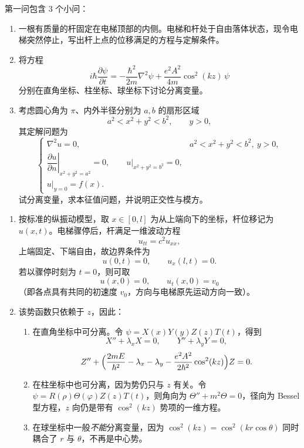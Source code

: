 ﻿

\begin{question}[回答以下问题]

第一问包含 3 个小问：
\begin{enumerate}[label=(\arabic*),leftmargin=2.6em,itemsep=0.25em,topsep=0.2em]
\item 一根有质量的杆固定在电梯顶部的内侧。电梯和杆处于自由落体状态，现令电梯突然停止，写出杆上点的位移满足的方程与定解条件。
\item 将方程
\[
 i\hbar\frac{\partial\psi}{\partial t}
 =-\frac{\hbar^2}{2m}\nabla^2\psi+\frac{e^2A^2}{4m}\cos^2(kz)\,\psi
\]
分别在直角坐标、柱坐标、球坐标下讨论分离变量。
\item 考虑圆心角为 $\pi$、内外半径分别为 $a,b$ 的扇形区域
\[
 a^2<x^2+y^2<b^2,\qquad y>0,
\]
其定解问题为
\[
\begin{cases}
\nabla^2u=0, & a^2<x^2+y^2<b^2,\ y>0,\\
\left.\dfrac{\partial u}{\partial n}\right|_{x^2+y^2=a^2}=0,
\qquad u|_{x^2+y^2=b^2}=0,\\
 u|_{y=0}=f(x).
\end{cases}
\]
试分离变量，求本征值问题，并说明正交性与模方。
\end{enumerate}

\begin{solution}

\begin{enumerate}[label=(\arabic*),leftmargin=2.6em,itemsep=0.25em,topsep=0.2em]
\item 按标准的纵振动模型，取 $x\in[0,l]$ 为从上端向下的坐标，杆位移记为 $u(x,t)$。电梯骤停后，杆满足一维波动方程
\[
 u_{tt}=c^2u_{xx},
\]
上端固定、下端自由，故边界条件为
\[
 u(0,t)=0,\qquad u_x(l,t)=0.
\]
若以骤停时刻为 $t=0$，则可取
\[
 u(x,0)=0,
\qquad u_t(x,0)=v_0
\]
（即各点具有共同的初速度 $v_0$，方向与电梯原先运动方向一致）。

\item 该势函数只依赖于 $z$，因此：
\begin{enumerate}[label=(\arabic*),leftmargin=2.6em,itemsep=0.25em,topsep=0.2em]
\item 在直角坐标中可分离。令 $\psi=X(x)Y(y)Z(z)T(t)$，得到
\[
X''+\lambda_x X=0,
\qquad Y''+\lambda_y Y=0,
\]
\[
Z''+\Bigl(\frac{2mE}{\hbar^2}-\lambda_x-\lambda_y-\frac{e^2A^2}{2\hbar^2}\cos^2(kz)\Bigr)Z=0.
\]
\item 在柱坐标中也可分离，因为势仍只与 $z$ 有关。令 $\psi=R(\rho)\Theta(\varphi)Z(z)T(t)$，则角向为 $\Theta''+m^2\Theta=0$，径向为 Bessel 型方程，$z$ 向仍是带有 $\cos^2(kz)$ 势项的一维方程。
\item 在球坐标中一般\emph{不能}分离变量，因为 $\cos^2(kz)=\cos^2(kr\cos\theta)$ 同时耦合了 $r$ 与 $\theta$，不再是中心势。
\end{enumerate}


\end{enumerate}
\end{solution}
\end{question}
